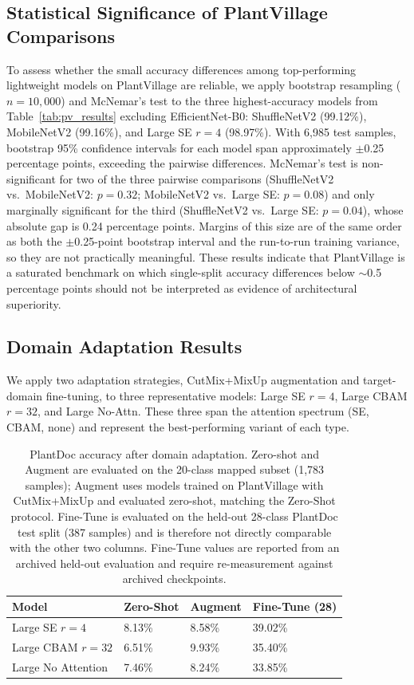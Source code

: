 \documentclass[preprint,12pt]{elsarticle}
\begin{document}
\subsection{Statistical Significance of PlantVillage Comparisons}

To assess whether the small accuracy differences among top-performing lightweight models on PlantVillage are reliable, we apply bootstrap resampling ($n=10{,}000$) and McNemar's test to the three highest-accuracy models from Table~\ref{tab:pv_results} excluding EfficientNet-B0: ShuffleNetV2 (99.12\%), MobileNetV2 (99.16\%), and Large SE $r=4$ (98.97\%). With 6,985 test samples, bootstrap 95\% confidence intervals for each model span approximately $\pm$0.25 percentage points, exceeding the pairwise differences. McNemar's test is non-significant for two of the three pairwise comparisons (ShuffleNetV2 vs.\ MobileNetV2: $p=0.32$; MobileNetV2 vs.\ Large SE: $p=0.08$) and only marginally significant for the third (ShuffleNetV2 vs.\ Large SE: $p=0.04$), whose absolute gap is 0.24 percentage points. Margins of this size are of the same order as both the $\pm$0.25-point bootstrap interval and the run-to-run training variance, so they are not practically meaningful. These results indicate that PlantVillage is a saturated benchmark on which single-split accuracy differences below $\sim$0.5 percentage points should not be interpreted as evidence of architectural superiority.

\subsection{Domain Adaptation Results}
\label{sec:da_results}

We apply two adaptation strategies, CutMix+MixUp augmentation and target-domain fine-tuning, to three representative models: Large SE $r=4$, Large CBAM $r=32$, and Large No-Attn. These three span the attention spectrum (SE, CBAM, none) and represent the best-performing variant of each type.

\begin{table}[t]
\centering
\caption{PlantDoc accuracy after domain adaptation. Zero-shot and Augment are evaluated on the 20-class mapped subset (1,783 samples); Augment uses models trained on PlantVillage with CutMix+MixUp and evaluated zero-shot, matching the Zero-Shot protocol. Fine-Tune is evaluated on the held-out 28-class PlantDoc test split (387 samples) and is therefore not directly comparable with the other two columns. Fine-Tune values are reported from an archived held-out evaluation and require re-measurement against archived checkpoints.}
\label{tab:da_results}
\begin{tabularx}{\textwidth}{lXXX}
\toprule
\textbf{Model} & \textbf{Zero-Shot} & \textbf{Augment} & \textbf{Fine-Tune (28)} \\
\midrule
Large SE $r=4$      & 8.13\% & 8.58\% & 39.02\% \\
Large CBAM $r=32$   & 6.51\% & 9.93\% & 35.40\% \\
Large No Attention  & 7.46\% & 8.24\% & 33.85\% \\
\bottomrule
\end{tabularx}
\end{table}
\end{document}
